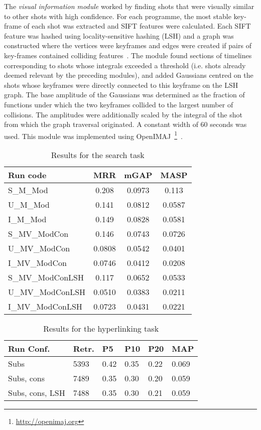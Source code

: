 \documentclass{../acm_proc_article-me11_tweaked}
\begin{document}
The \emph{visual information module} worked by finding shots that were 
visually similar to other shots with high confidence. For each programme, 
the most stable key-frame of each shot was extracted and SIFT features were 
calculated. Each SIFT feature was hashed using locality-sensitive hashing 
(LSH) and a graph was constructed where the vertices were keyframes and edges were created if pairs of key-frames contained colliding features~\cite{Hare:2013:TVP:2461466.2461514}. The module found sections of timelines corresponding to shots whose integrals exceeded a threshold (i.e. shots already deemed relevant by the preceding modules), and added Gaussians 
centred on the shots whose keyframes were directly connected to this keyframe 
on the LSH graph. The base amplitude of the Gaussians was determined as the 
fraction of functions under which the two keyframes collided to the largest 
number of collisions. The amplitudes were additionally scaled by the 
integral of the shot from which the graph traversal originated. A constant 
width of 60 seconds was used. This module was implemented using OpenIMAJ~\footnote{\url{http://openimaj.org}}~\cite{Hare:2011:OIJ:2072298.2072421}.

\begin{table}
	\small
	\centering
	\caption{Results for the search task}
	\label{tbl:searchresults}
\begin{tabular}{|l|c|c|c|}
\hline
\textbf{Run code} & \textbf{MRR} &
\textbf{mGAP} &
\textbf{MASP} \\
\hline
S\_M\_Mod & 0.208 & 0.0973 & 0.113 \\ %
U\_M\_Mod & 0.141 & 0.0812 & 0.0587 \\ %
I\_M\_Mod & 0.149 & 0.0828 & 0.0581 \\ %
S\_MV\_ModCon & 0.146 & 0.0743 & 0.0726 \\ %
U\_MV\_ModCon & 0.0808 & 0.0542 & 0.0401 \\ %
I\_MV\_ModCon & 0.0746 & 0.0412 & 0.0208 \\ %
S\_MV\_ModConLSH & 0.117 & 0.0652 & 0.0533 \\ %
U\_MV\_ModConLSH & 0.0510 & 0.0383 & 0.0211 \\
I\_MV\_ModConLSH & 0.0723 & 0.0431 & 0.0221 \\ %
\hline
\end{tabular}
\end{table}

\begin{table}
	\small
\centering
\caption{Results for the hyperlinking task}
\label{tbl:hyperresults}
\begin{tabular}{|l|l|l|l|l|l|}
\hline
\textbf{Run Conf.} & \textbf{Retr.} & \textbf{P5} & \textbf{P10} &
\textbf{P20} & \textbf{MAP}\\
\hline
Subs & 5393 & 0.42 & 0.35 & 0.22 & 0.069\\
Subs, cons & 7489 & 0.35 & 0.30 & 0.20 & 0.059 \\
Subs, cons, LSH & 7488 & 0.35 & 0.30 & 0.21 & 0.059 \\
\hline
\end{tabular}
\end{table}
\end{document}
